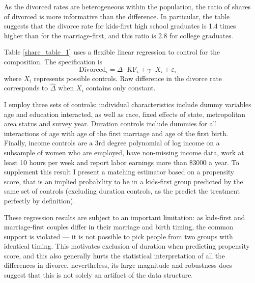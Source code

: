 \documentclass[12pt,letter]{article}
\begin{document}
As the divorced rates are heterogeneous within the population, the ratio of shares of divorced is more informative than the difference. In particular, the table suggests that the divorce rate for kids-first high school graduates is 1.4 times higher than for the marriage-first, and this ratio is 2.8 for college graduates. 

Table \ref{share_table_1} uses a flexible linear regression to control for the composition. The specification is
\[\text{Divorced}_i =\Delta\cdot \text{KF}_i + \gamma \cdot X_i + \varepsilon_i\]
where $X_i$ represents possible controls. Raw difference in the divorce rate corresponds to $\hat\Delta$ when $X_i$ contains only constant.

I employ three sets of controls: individual characteristics include dummy variables age and education interacted, as well as race, fixed effects of state, metropolitan area status and survey year. Duration controls include dummies for all interactions of age with age of the first marriage and age of the first birth. Finally, income controls are a 3rd degree polynomial of log income on a subsample of women who are employed, have non-missing income data, work at least 10 hours per week and report labor earnings more than \$3000 a year. To supplement this result I present a matching estimator based on a propensity score, that is an implied probability to be in a kids-first group predicted by the same set of controls (excluding duration controls, as the predict the treatment perfectly by definition).
 
These regression results are subject to an important limitation: as kids-first and marriage-first couples differ in their marriage and birth timing, the common support is violated --- it is not possible to pick people from two groups with identical timing. This motivates exclusion of duration when predicting propensity score, and this also generally hurts the statistical interpretation of all the differences in divorce, nevertheless, its large magnitude and robustness does suggest that this is not solely an artifact of the data structure.
\end{document}
